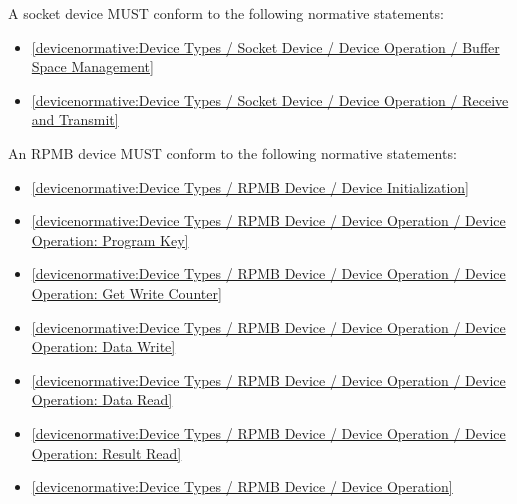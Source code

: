 \label{sec:Conformance / Device Conformance / Socket Device Conformance}

A socket device MUST conform to the following normative statements:

\begin{itemize}
\item \ref{devicenormative:Device Types / Socket Device / Device Operation / Buffer Space Management}
\item \ref{devicenormative:Device Types / Socket Device / Device Operation / Receive and Transmit}
\end{itemize}

\label{sec:Conformance / Device Conformance / RPMB Device Conformance}

An RPMB device MUST conform to the following normative statements:

\begin{itemize}
\item \ref{devicenormative:Device Types / RPMB Device / Device Initialization}
\item \ref{devicenormative:Device Types / RPMB Device / Device Operation / Device Operation: Program Key}
\item \ref{devicenormative:Device Types / RPMB Device / Device Operation / Device Operation: Get Write Counter}
\item \ref{devicenormative:Device Types / RPMB Device / Device Operation / Device Operation: Data Write}
\item \ref{devicenormative:Device Types / RPMB Device / Device Operation / Device Operation: Data Read}
\item \ref{devicenormative:Device Types / RPMB Device / Device Operation / Device Operation: Result Read}
\item \ref{devicenormative:Device Types / RPMB Device / Device Operation}
\end{itemize}

\label{sec:Conformance / Device Conformance / IOMMU Device Conformance}

